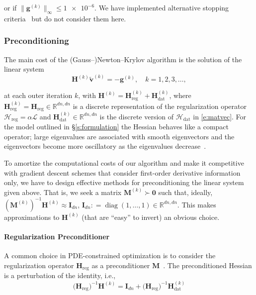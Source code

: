 \documentclass[11pt]{amsart}
\newcommand{\secref}[1]{\S\ref{#1}}
\newcommand\op[1]{\ensuremath{\mathcal{#1}}}
\newcommand\di[1]{\ensuremath{\mathbf{#1}}}
\newcommand{\defeq}{\ensuremath{\mathrel{\mathop:}=}}
\newcommand\scinum[1]{\num[round-precision=0,round-mode=places,tight-spacing=true,retain-zero-exponent=true,retain-explicit-plus=true,output-exponent-marker=\text{e}]{#1}}
\begin{document}
\noindent or if $\|\di{g}^{(k)}\|_{\infty} \leq \scinum{1e-6}$. We have implemented alternative stopping criteria~\cite{Mang:2015a} but do not consider them here.




\subsubsection{Preconditioning}

The main cost of the {(Gauss--)}Newton--Krylov algorithm is the solution of the linear system
\begin{equation}\label{e:reducedspacekkt}
\di{H}^{(k)} \di{\tilde{v}}^{(k)} = -\di{g}^{(k)},\quad k = 1,2,3, \ldots,
\end{equation}

\noindent at each outer iteration $k$, with $\di{H}^{(k)} = \di{H}_{\text{reg}}^{(k)} + \di{H}_{\text{dat}}^{(k)}$, where $\di{H}_{\text{reg}}^{(k)} = \di{H}_{\text{reg}}\in\mathbb{R}^{dn,dn}$ is a discrete representation of the regularization operator $\op{H}_{\text{reg}} = \alpha\op{L}$ and $\di{H}_{\text{dat}}^{(k)} \in \mathbb{R}^{dn,dn}$ is the discrete version of $\op{H}_{\text{dat}}$ in \eqref{e:matvec}. For the model outlined in \secref{s:formulation} the Hessian behaves like a compact operator; large eigenvalues are associated with smooth eigenvectors and the eigenvectors become more oscillatory as the eigenvalues decrease~\cite{Mang:2015a}.

To amortize the computational costs of our algorithm and make it competitive with gradient descent schemes that consider first-order derivative information only, we have to design effective methods for preconditioning the linear system given above. That is, we seek a matrix $\di{M}^{(k)}\succ \di{0}$ such that, ideally, $(\di{M}^{(k)})^{-1} \di{H}^{(k)} \approx \di{I}_{dn}$, $\di{I}_{dn} \defeq \operatorname{diag}(1,\ldots,1) \in \mathbb{R}^{dn,dn}$. This makes approximations to $\di{H}^{(k)}$ (that are ``easy'' to invert) an obvious choice.




\paragraph{Regularization Preconditioner}

A common choice in PDE-constrained optimization is to consider the regularization operator $\di{H}_{\text{reg}}$ as a preconditioner $\di{M}$~\cite{Bui:2012a,BuiThanh:2013a,Alexanderian:2016a}. The preconditioned Hessian is a perturbation of the identity, i.e.,
\[
\big(\di{H}_{\text{reg}}\big)^{-1} \di{H}^{(k)}
= \di{I}_{dn} + \big(\di{H}_{\text{reg}}\big)^{-1}\di{H}_{\text{dat}}^{(k)}
\]
\end{document}
